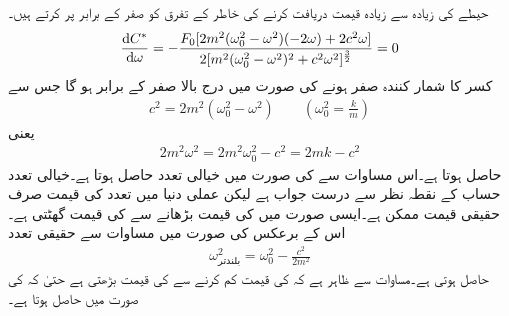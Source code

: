 حیطے کی زیادہ سے زیادہ قیمت دریافت کرنے کی خاطر  کے تفرق کو صفر کے برابر  پر کرتے ہیں۔
\begin{align*}
\frac{\dif C^*}{\dif \omega}=-\frac{F_0[2m^2(\omega_0^2-\omega^2)(-2\omega)+2c^2\omega]}{2[m^2(\omega_0^2-\omega^2)^2+c^2\omega^2]^{\frac{3}{2}}}=0
\end{align*}
کسر کا شمار کنندہ صفر ہونے کی صورت میں درج بالا صفر کے برابر ہو گا جس سے
\begin{align}
c^2=2m^2(\omega_0^2-\omega^2)\quad \quad (\omega_0^2=\frac{k}{m})
\end{align}
یعنی
\begin{align}\label{مساوات_سادہ_دو_عملی_گمک_تعدد_الف}
2m^2\omega^2=2m^2\omega_0^2-c^2=2mk-c^2
\end{align}
حاصل ہوتا ہے۔اس مساوات سے   کی صورت میں خیالی تعدد  حاصل ہوتا ہے۔خیالی تعدد حساب کے نقطہ نظر سے درست جواب  ہے لیکن عملی دنیا میں تعدد کی قیمت صرف حقیقی قیمت ممکن ہے۔ایسی صورت میں  کی قیمت بڑھانے سے  کی قیمت گھٹتی ہے۔اس کے برعکس  کی صورت میں  مساوات  سے حقیقی تعدد 
\begin{align}\label{مساوات_سادہ_دو_عملی_گمک_تعدد_ب}
\omega^2_{\text{بلندتر}}=\omega_0^2-\frac{c^2}{2m^2}
\end{align}
حاصل ہوتی ہے۔مساوات  سے ظاہر ہے کہ  کی قیمت کم کرنے سے  کی قیمت  بڑھتی ہے حتیٰ کہ  کی صورت میں  حاصل ہوتا ہے۔

